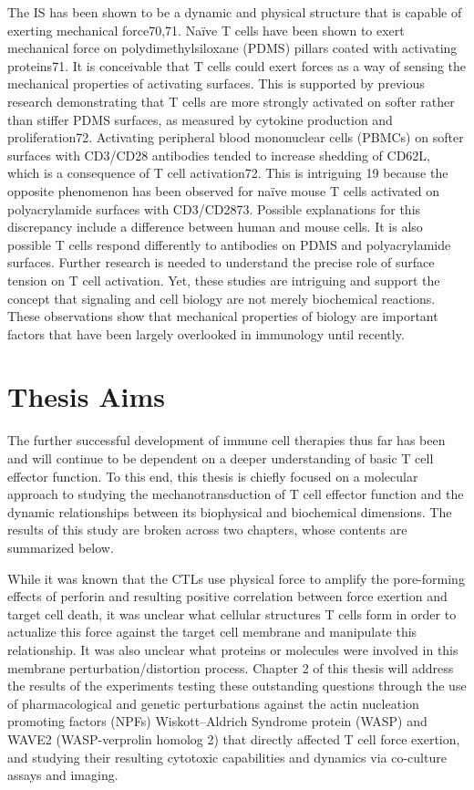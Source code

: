 The IS has been shown to be a dynamic and physical structure that is
capable of exerting mechanical force70,71. Naïve T cells have been shown to
exert mechanical force on polydimethylsiloxane (PDMS) pillars coated with
activating proteins71. It is conceivable that T cells could exert forces as a way
of sensing the mechanical properties of activating surfaces. This is supported
by previous research demonstrating that T cells are more strongly activated on
softer rather than stiffer PDMS surfaces, as measured by cytokine production
and proliferation72. Activating peripheral blood mononuclear cells (PBMCs) on
softer surfaces with CD3/CD28 antibodies tended to increase shedding of
CD62L, which is a consequence of T cell activation72. This is intriguing
19
because the opposite phenomenon has been observed for naïve mouse T
cells activated on polyacrylamide surfaces with CD3/CD2873. Possible
explanations for this discrepancy include a difference between human and
mouse cells. It is also possible T cells respond differently to antibodies on
PDMS and polyacrylamide surfaces. Further research is needed to understand
the precise role of surface tension on T cell activation. Yet, these studies are
intriguing and support the concept that signaling and cell biology are not
merely biochemical reactions. These observations show that mechanical
properties of biology are important factors that have been largely overlooked
in immunology until recently.


\section{Thesis Aims}
The further successful development of immune cell therapies thus far has been and will continue to be dependent on a deeper understanding of basic T cell effector function. To this end, this thesis is chiefly focused on a molecular approach to studying the mechanotransduction of T cell effector function and the dynamic relationships between its biophysical and biochemical dimensions. The results of this study are broken across two chapters, whose contents are summarized below.

While it was known that the CTLs use physical force to amplify the pore-forming effects of perforin and resulting positive correlation between force exertion and  target cell death, it was unclear what cellular structures T cells form in order to actualize this force against the target cell membrane and manipulate this relationship. It was also unclear what proteins or molecules were involved in this membrane perturbation/distortion process. Chapter 2 of this thesis will address the results of the experiments testing these outstanding questions through the use of pharmacological and genetic perturbations against the actin nucleation promoting factors (NPFs) Wiskott–Aldrich Syndrome protein (WASP) and WAVE2 (WASP-verprolin homolog 2) that directly affected T cell force exertion, and studying their resulting cytotoxic capabilities and dynamics via co-culture assays and imaging.

